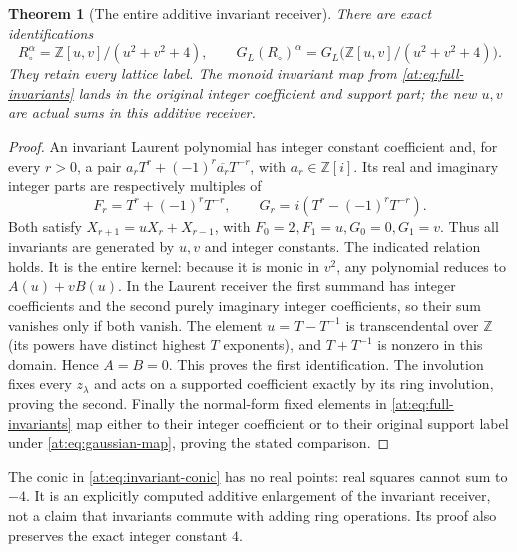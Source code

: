 \documentclass[11pt,a4paper]{article}
\newtheorem{theorem}{Theorem}[section]
\theoremstyle{definition}\newtheorem{definition}[theorem]{Definition}
\newcommand{\Z}{\mathbb Z}\newcommand{\Q}{\mathbb Q}
\begin{document}
\begin{theorem}[The entire additive invariant receiver]
\label{at:thm:invariant-conic}
There are exact identifications
\[
 R_\circ^\alpha=\Z[u,v]/(u^2+v^2+4),\qquad
 G_L(R_\circ)^\alpha=G_L\bigl(\Z[u,v]/(u^2+v^2+4)\bigr).
 \tag{AT29}\label{at:eq:invariant-conic}
\]
They retain every lattice label. The monoid invariant map from
\eqref{at:eq:full-invariants} lands in the original integer
coefficient and support part; the new $u,v$ are actual sums
in this additive receiver.
\end{theorem}
\begin{proof}
An invariant Laurent polynomial has integer constant coefficient
and, for every $r>0$, a pair
$a_rT^r+(-1)^r\overline{a_r}T^{-r}$, with $a_r\in\Z[i]$.
Its real and imaginary integer parts are respectively multiples of
\[
 F_r=T^r+(-1)^rT^{-r},\qquad
 G_r=i(T^r-(-1)^rT^{-r}).
\]
Both satisfy $X_{r+1}=uX_r+X_{r-1}$, with
$F_0=2,F_1=u,G_0=0,G_1=v$. Thus all invariants are generated
by $u,v$ and integer constants. The indicated relation holds.
It is the entire kernel: because it is monic in $v^2$, any
polynomial reduces to $A(u)+vB(u)$. In the Laurent receiver the
first summand has integer coefficients and the second purely
imaginary integer coefficients, so their sum vanishes only if
both vanish. The element $u=T-T^{-1}$ is transcendental over
$\Z$ (its powers have distinct highest $T$ exponents), and
$T+T^{-1}$ is nonzero in this domain. Hence $A=B=0$.
This proves the first identification. The involution fixes every
$z_\lambda$ and acts on a supported coefficient exactly by its
ring involution, proving the second. Finally the normal-form
fixed elements in \eqref{at:eq:full-invariants} map either to their
integer coefficient or to their original support label under
\eqref{at:eq:gaussian-map}, proving the stated comparison.
\end{proof}

The conic in \eqref{at:eq:invariant-conic} has no real points:
real squares cannot sum to $-4$. It is an explicitly computed
additive enlargement of the invariant receiver, not a claim
that invariants commute with adding ring operations. Its proof
also preserves the exact integer constant $4$.
\end{document}
